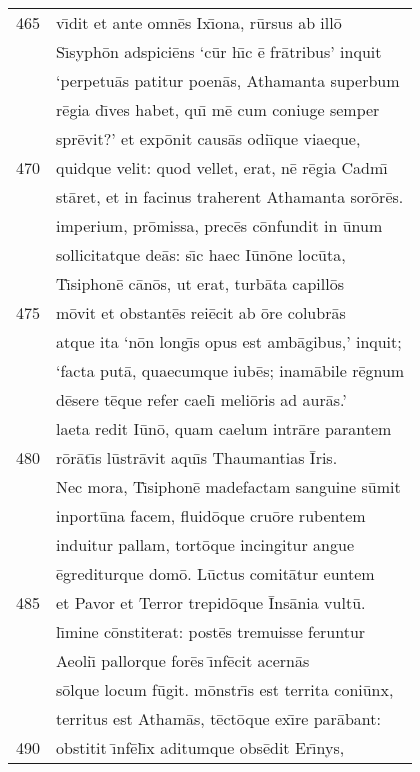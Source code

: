 \documentclass[paper=6in:9in,pagesize=pdftex,
               headinclude=on,footinclude=on,12pt]{scrbook}
\begin{document}
\begin{longtable}[p]{ r l }
465 & v\={\i}dit et ante omn\=es Ix\={\i}ona, r\=ursus ab ill\=o\\ 
 & S\={\i}syph\=on adspici\=ens `c\=ur h\={\i}c \=e fr\=atribus' inquit\\ 
 & `perpetu\=as patitur poen\=as, Athamanta superbum\\ 
 & r\=egia d\={\i}ves habet, qu\={\i} m\=e cum coniuge semper\\ 
 & spr\=evit?' et exp\=onit caus\=as odi\={\i}que viaeque,\\ 
470 & quidque velit: quod vellet, erat, n\=e r\=egia Cadm\={\i}\\ 
 & st\=aret, et in facinus traherent Athamanta sor\=or\=es.\\ 
 & imperium, pr\=omissa, prec\=es c\=onfundit in \=unum\\ 
 & sollicitatque de\=as: s\={\i}c haec I\=un\=one loc\=uta,\\ 
 & T\={\i}siphon\=e c\=an\=os, ut erat, turb\=ata capill\=os\\ 
475 & m\=ovit et obstant\=es rei\=ecit ab \=ore colubr\=as\\ 
 & atque ita `n\=on long\={\i}s opus est amb\=agibus,' inquit;\\ 
 & `facta put\=a, quaecumque iub\=es; inam\=abile r\=egnum\\ 
 & d\=esere t\=eque refer cael\={\i} meli\=oris ad aur\=as.'\\ 
 & laeta redit I\=un\=o, quam caelum intr\=are parantem\\ 
480 & r\=or\=at\={\i}s l\=ustr\=avit aqu\={\i}s Thaumantias \=Iris.\\ 
 & \indent Nec mora, T\={\i}siphon\=e madefactam sanguine s\=umit\\ 
 & inport\=una facem, fluid\=oque cru\=ore rubentem\\ 
 & induitur pallam, tort\=oque incingitur angue\\ 
 & \=egrediturque dom\=o. L\=uctus comit\=atur euntem\\ 
485 & et Pavor et Terror trepid\=oque \=Ins\=ania vult\=u.\\ 
 & l\={\i}mine c\=onstiterat: post\=es tremuisse feruntur\\ 
 & Aeoli\={\i} pallorque for\=es \={\i}nf\=ecit acern\=as\\ 
 & s\=olque locum f\=ugit. m\=onstr\={\i}s est territa coni\=unx,\\ 
 & territus est Atham\=as, t\=ect\=oque ex\={\i}re par\=abant:\\ 
490 & obstitit \={\i}nf\=el\={\i}x aditumque obs\=edit Er\={\i}nys,\\ 

\end{longtable}
\end{document}
